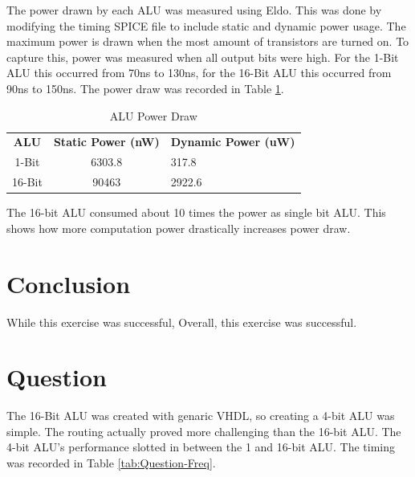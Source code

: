 \documentclass[11pt]{article}
\begin{document}
		The power drawn by each ALU was measured using Eldo. This was done by modifying the timing SPICE file to include static and dynamic power usage. The maximum power is drawn when the most amount of transistors are turned on. To capture this, power was measured when all output bits were high. For the 1-Bit ALU this occurred from 70ns to 130ns, for the 16-Bit ALU this occurred from 90ns to 150ns. The power draw was recorded in Table \ref{tab:ALU-power}.
	
		\begin{table}[H]
			\centering
			\caption{ALU Power Draw}
			\label{tab:ALU-power}
			\begin{tabular}{ccl}
				\textbf{ALU} & \textbf{Static Power (nW)} & \textbf{Dynamic Power (uW)} \\
				1-Bit        & 6303.8                     & 317.8                       \\
				16-Bit       & 90463                      & 2922.6                     
			\end{tabular}
		\end{table}
	
		The 16-bit ALU consumed about 10 times the power as single bit ALU. This shows how more computation power drastically increases power draw. 
			

\section{Conclusion}
	While this exercise was successful,  Overall, this exercise was successful.

\section{Question}

	The 16-Bit ALU was created with genaric VHDL, so creating a 4-bit ALU was simple. The routing actually proved more challenging than the 16-bit ALU. The 4-bit ALU's performance slotted in between the 1 and 16-bit ALU. The timing was recorded in Table \ref{tab:Question-Freq}.
\end{document}
